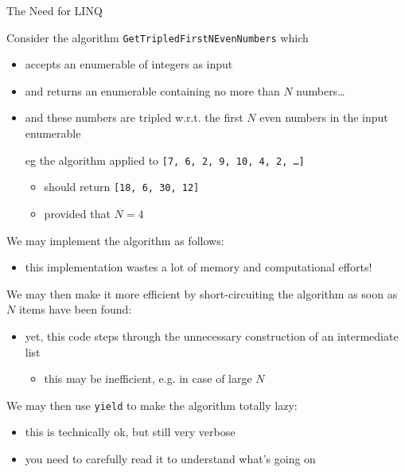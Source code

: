 \documentclass[presentation]{beamer}
\begin{document}
\begin{frame}[allowframebreaks]{The Need for LINQ}
  \begin{block}{Consider the algorithm \texttt{GetTripledFirstNEvenNumbers} which}
    \begin{itemize}
      \item accepts an enumerable of integers as input
      \item and returns an enumerable containing no more than $N$ numbers\ldots
      \item and these numbers are \alert{tripled} w.r.t. the \alert{first $N$ even} numbers in the input enumerable
    \end{itemize}
  \end{block}
  \begin{itemize}
    \item[eg] the algorithm applied to \texttt{[7, \alert{6}, \alert{2}, 9, \alert{10}, \alert{4}, 2, \ldots]}
    \begin{itemize}
      \item should return \texttt{[18, 6, 30, 12]}
      \item provided that $N = 4$
    \end{itemize} 
  \end{itemize}

  \framebreak

  We may implement the algorithm as follows:
  \begin{itemize}
    \item this implementation wastes a lot of memory and computational efforts!
  \end{itemize}

  \framebreak

  We may then make it more efficient by short-circuiting the algorithm as soon as $N$ items have been found:
  \begin{itemize}
    \item yet, this code steps through the unnecessary construction of an intermediate list
    \begin{itemize}
      \item this may be inefficient, e.g. in case of large $N$
    \end{itemize}
  \end{itemize}

  \framebreak

  We may then use \texttt{yield} to make the algorithm totally \alert{lazy}:
  \begin{itemize}
    \item this is technically ok, but still very verbose
    \item you need to carefully read it to understand what's going on
  \end{itemize}


\end{frame}
\end{document}
